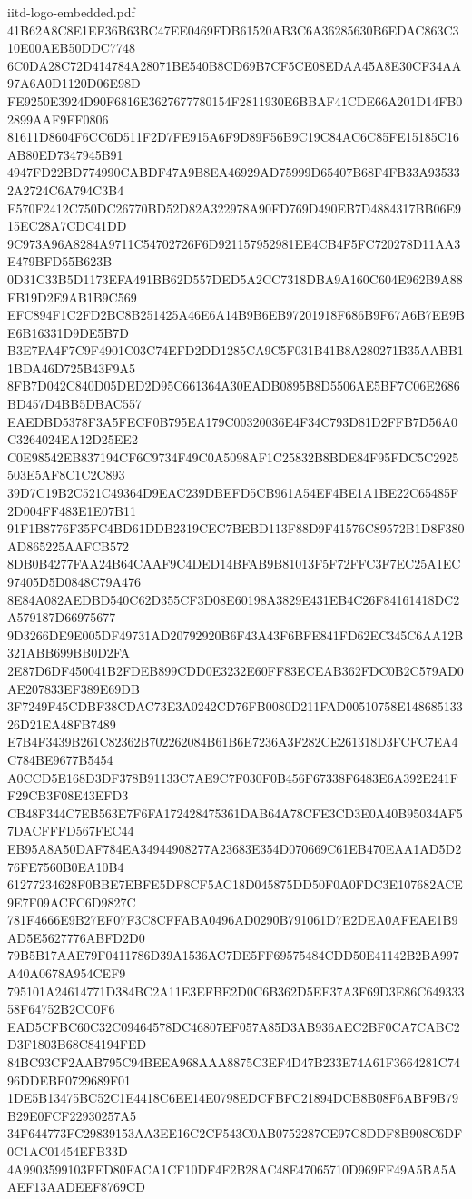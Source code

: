 \begin{filecontents*}[overwrite]{iitd-logo-embedded.pdf}
41B62A8C8E1EF36B63BC47EE0469FDB61520AB3C6A36285630B6EDAC863C310E00AEB50DDC7748
6C0DA28C72D414784A28071BE540B8CD69B7CF5CE08EDAA45A8E30CF34AA97A6A0D1120D06E98D
FE9250E3924D90F6816E3627677780154F2811930E6BBAF41CDE66A201D14FB02899AAF9FF0806
81611D8604F6CC6D511F2D7FE915A6F9D89F56B9C19C84AC6C85FE15185C16AB80ED7347945B91
4947FD22BD774990CABDF47A9B8EA46929AD75999D65407B68F4FB33A935332A2724C6A794C3B4
E570F2412C750DC26770BD52D82A322978A90FD769D490EB7D4884317BB06E915EC28A7CDC41DD
9C973A96A8284A9711C54702726F6D921157952981EE4CB4F5FC720278D11AA3E479BFD55B623B
0D31C33B5D1173EFA491BB62D557DED5A2CC7318DBA9A160C604E962B9A88FB19D2E9AB1B9C569
EFC894F1C2FD2BC8B251425A46E6A14B9B6EB97201918F686B9F67A6B7EE9BE6B16331D9DE5B7D
B3E7FA4F7C9F4901C03C74EFD2DD1285CA9C5F031B41B8A280271B35AABB11BDA46D725B43F9A5
8FB7D042C840D05DED2D95C661364A30EADB0895B8D5506AE5BF7C06E2686BD457D4BB5DBAC557
EAEDBD5378F3A5FECF0B795EA179C00320036E4F34C793D81D2FFB7D56A0C3264024EA12D25EE2
C0E98542EB837194CF6C9734F49C0A5098AF1C25832B8BDE84F95FDC5C2925503E5AF8C1C2C893
39D7C19B2C521C49364D9EAC239DBEFD5CB961A54EF4BE1A1BE22C65485F2D004FF483E1E07B11
91F1B8776F35FC4BD61DDB2319CEC7BEBD113F88D9F41576C89572B1D8F380AD865225AAFCB572
8DB0B4277FAA24B64CAAF9C4DED14BFAB9B81013F5F72FFC3F7EC25A1EC97405D5D0848C79A476
8E84A082AEDBD540C62D355CF3D08E60198A3829E431EB4C26F84161418DC2A579187D66975677
9D3266DE9E005DF49731AD20792920B6F43A43F6BFE841FD62EC345C6AA12B321ABB699BB0D2FA
2E87D6DF450041B2FDEB899CDD0E3232E60FF83ECEAB362FDC0B2C579AD0AE207833EF389E69DB
3F7249F45CDBF38CDAC73E3A0242CD76FB0080D211FAD00510758E14868513326D21EA48FB7489
E7B4F3439B261C82362B702262084B61B6E7236A3F282CE261318D3FCFC7EA4C784BE9677B5454
A0CCD5E168D3DF378B91133C7AE9C7F030F0B456F67338F6483E6A392E241FF29CB3F08E43EFD3
CB48F344C7EB563E7F6FA172428475361DAB64A78CFE3CD3E0A40B95034AF57DACFFFD567FEC44
EB95A8A50DAF784EA34944908277A23683E354D070669C61EB470EAA1AD5D276FE7560B0EA10B4
61277234628F0BBE7EBFE5DF8CF5AC18D045875DD50F0A0FDC3E107682ACE9E7F09ACFC6D9827C
781F4666E9B27EF07F3C8CFFABA0496AD0290B791061D7E2DEA0AFEAE1B9AD5E5627776ABFD2D0
79B5B17AAE79F0411786D39A1536AC7DE5FF69575484CDD50E41142B2BA997A40A0678A954CEF9
795101A24614771D384BC2A11E3EFBE2D0C6B362D5EF37A3F69D3E86C64933358F64752B2CC0F6
EAD5CFBC60C32C09464578DC46807EF057A85D3AB936AEC2BF0CA7CABC2D3F1803B68C84194FED
84BC93CF2AAB795C94BEEA968AAA8875C3EF4D47B233E74A61F3664281C7496DDEBF0729689F01
1DE5B13475BC52C1E4418C6EE14E0798EDCFBFC21894DCB8B08F6ABF9B79B29E0FCF22930257A5
34F644773FC29839153AA3EE16C2CF543C0AB0752287CE97C8DDF8B908C6DF0C1AC01454EFB33D
4A9903599103FED80FACA1CF10DF4F2B28AC48E47065710D969FF49A5BA5AAEF13AADEEF8769CD

\end{filecontents*}
